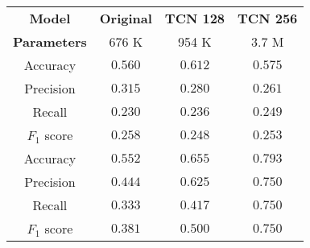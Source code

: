 \begin{tabular}{c|ccc}
    \textbf{Model}      & \textbf{Original} & \textbf{TCN 128} & \textbf{TCN 256} \\
    \textbf{Parameters} & 676 K             & 954 K            & 3.7 M            \\\hline
    Accuracy            & $0.560$           & $\mathbf{0.612}$ & $0.575$          \\
    Precision           & $\mathbf{0.315}$  & $0.280$          & $0.261$          \\
    Recall              & $0.230$           & $\mathbf{0.236}$ & $0.249$          \\
    $F_1$ score         & $\mathbf{0.258}$  & $0.248$          & $0.253$          \\\hline
    Accuracy            & $0.552$           & $0.655$          & $\mathbf{0.793}$ \\
    Precision           & $0.444$           & $0.625$          & $\mathbf{0.750}$ \\
    Recall              & $0.333$           & $0.417$          & $\mathbf{0.750}$ \\
    $F_1$ score         & $0.381$           & $0.500$          & $\mathbf{0.750}$ \\
\end{tabular}